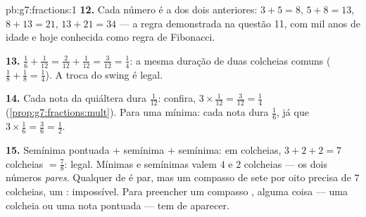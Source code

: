 \begin{solution}{pb:g7:fractions:1}
\textbf{12.} Cada número é a  dos dois anteriores: $3 + 5 = 8$,
$5 + 8 = 13$, $8 + 13 = 21$, $13 + 21 = 34$ --- a regra demonstrada na
questão 11, com mil anos de idade e hoje conhecida como regra de
Fibonacci.

\textbf{13.} $\frac16 + \frac{1}{12} = \frac{2}{12} + \frac{1}{12} =
\frac{3}{12} = \frac14$: a mesma duração de duas colcheias comuns
($\frac18 + \frac18 = \frac14$). A troca do swing é legal.

\textbf{14.} Cada nota da quiáltera dura $\frac{1}{12}$: confira,
$3 \times \frac{1}{12} = \frac{3}{12} = \frac14$
(\cref{prop:g7:fractions:mult}). Para uma mínima: cada nota dura
$\frac16$, já que $3 \times \frac16 = \frac36 = \frac12$.

\textbf{15.} Semínima pontuada $+$ semínima $+$ semínima: em colcheias,
$3 + 2 + 2 = 7$ colcheias $= \frac78$: legal. Mínimas e semínimas valem
$4$ e $2$ colcheias --- os dois números \emph{pares}. Qualquer  de
 é par, mas um compasso de sete por oito precisa de $7$
colcheias, um : impossível. Para preencher um compasso
, alguma coisa  --- uma colcheia ou uma nota pontuada ---
tem de aparecer.
\end{solution}
